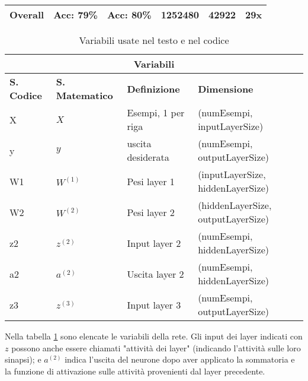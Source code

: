 \begin{table}[]
\begin{center}
\begin{tabular}{@{}l||lllll@{}}
\textbf{Overall}                                                                           & \textbf{Acc: 79\%}                                                                    & \textbf{Acc: 80\%}                                                                            & \textbf{1252480}                      & \textbf{42922}                      & \textbf{29x}                       \\ \bottomrule
\end{tabular}

\end{center}
\end{table}

\begin{table}[h!]
\caption{Variabili usate nel testo e nel codice}
\label{tab:variabili}
\begin{center}
\begin{tabular}{ |p{3cm}||p{3cm}|p{3cm}|p{3cm}|  }
 \hline
 \multicolumn{4}{|c|}{\textbf{Variabili}} \\
 \hline
 \textbf{S. Codice} & \textbf{S. Matematico} & \textbf{Definizione} & \textbf{Dimensione}\\
 \hline
 X	& $X$	&Esempi, 1 per riga&	\makecell{(numEsempi, \\inputLayerSize)}\\
 \hline
 y&	$y$	& uscita desiderata	& \makecell{(numEsempi, \\outputLayerSize)}\\
 \hline
 W1 & $W^{(1)}$	& Pesi layer 1&	\makecell{(inputLayerSize, \\hiddenLayerSize)}\\
 \hline
 W2	& $W^{(2)}$   & Pesi layer 2&	(hiddenLayerSize, outputLayerSize)\\
 \hline
 z2 & $z^{(2)}$	& Input layer 2& \makecell{(numEsempi, \\hiddenLayerSize)}\\
 \hline
 a2 & $a^{(2)}$	& Uscita layer 2& \makecell{(numEsempi, \\hiddenLayerSize)}\\
 \hline
 z3 & $z^{(3)}$	& Input layer 3& \makecell{(numEsempi, \\outputLayerSize)}\\
  \hline
 \end{tabular}
 \end{center}
 \end{table}
Nella tabella \ref{tab:variabili} sono elencate le variabili della rete. Gli input dei layer indicati con $z$ possono anche essere chiamati "attività dei layer" (indicando l'attività sulle loro sinapsi); e $a^{(2)}$ indica l'uscita del neurone dopo aver applicato la sommatoria e la funzione di attivazione sulle attività provenienti dal layer precedente.

